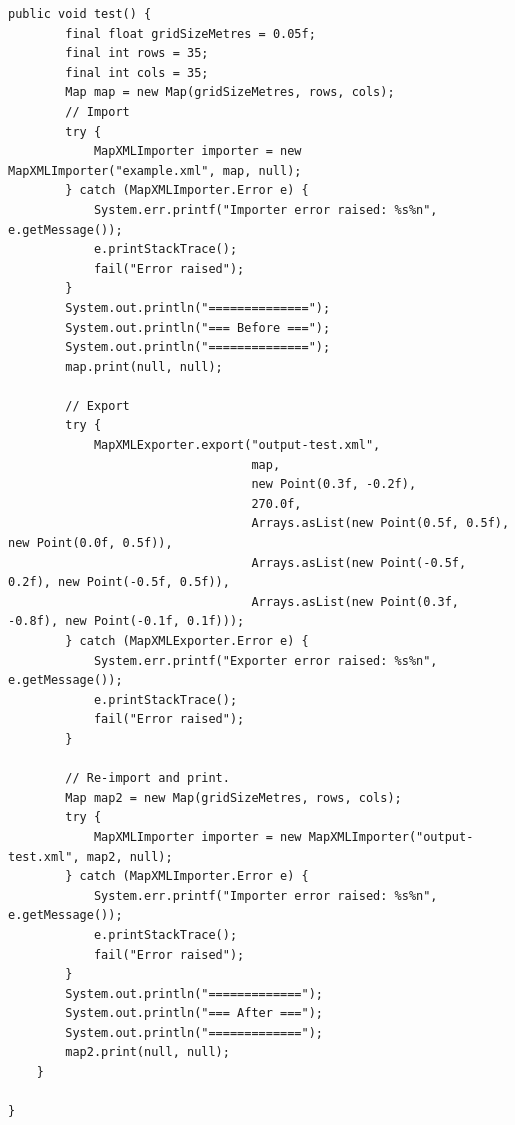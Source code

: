 \documentclass[12pt,a4paper]{article}
\begin{document}
 	 
     \begin{lstlisting}[caption=MapXMLExporter automated test suite, captionpos=b, label={lst:MapXMLExporterAutomatedTestSuite}]
     public void test() {
        final float gridSizeMetres = 0.05f;
        final int rows = 35;
        final int cols = 35;
        Map map = new Map(gridSizeMetres, rows, cols);
        // Import
        try {
            MapXMLImporter importer = new MapXMLImporter("example.xml", map, null);
        } catch (MapXMLImporter.Error e) {
            System.err.printf("Importer error raised: %s%n", e.getMessage());
            e.printStackTrace();
            fail("Error raised");
        }
        System.out.println("==============");
        System.out.println("=== Before ===");
        System.out.println("==============");
        map.print(null, null);
        
        // Export
        try {
            MapXMLExporter.export("output-test.xml",
                                  map,
                                  new Point(0.3f, -0.2f),
                                  270.0f,
                                  Arrays.asList(new Point(0.5f, 0.5f), new Point(0.0f, 0.5f)),
                                  Arrays.asList(new Point(-0.5f, 0.2f), new Point(-0.5f, 0.5f)),
                                  Arrays.asList(new Point(0.3f, -0.8f), new Point(-0.1f, 0.1f)));
        } catch (MapXMLExporter.Error e) {
            System.err.printf("Exporter error raised: %s%n", e.getMessage());
            e.printStackTrace();
            fail("Error raised");
        }
        
        // Re-import and print.
        Map map2 = new Map(gridSizeMetres, rows, cols);
        try {
            MapXMLImporter importer = new MapXMLImporter("output-test.xml", map2, null);
        } catch (MapXMLImporter.Error e) {
            System.err.printf("Importer error raised: %s%n", e.getMessage());
            e.printStackTrace();
            fail("Error raised");
        }
        System.out.println("=============");
        System.out.println("=== After ===");
        System.out.println("=============");
        map2.print(null, null);
    }

}    
     \end{lstlisting}
     
\end{document}
